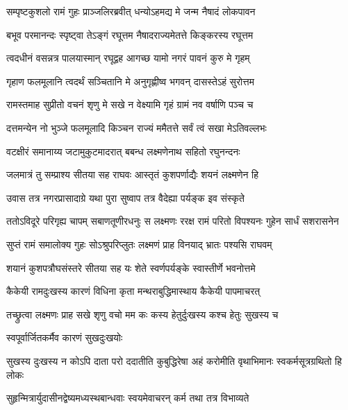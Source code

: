\twolineshloka
{सम्पृष्टकुशलो रामं गुहः प्राञ्जलिरब्रवीत्}
{धन्योऽहमद्य मे जन्म नैषादं लोकपावन} %

\twolineshloka
{बभूव परमानन्दः स्पृष्ट्वा तेऽङ्गं रघूत्तम}
{नैषादराज्यमेतत्ते किङ्करस्य रघूत्तम} %

\twolineshloka
{त्वदधीनं वसन्नत्र पालयास्मान् रघूद्वह}
{आगच्छ यामो नगरं पावनं कुरु मे गृहम्} %

\twolineshloka
{गृहाण फलमूलानि त्वदर्थं सञ्चितानि मे}
{अनुगृह्णीष्व भगवन् दासस्तेऽहं सुरोत्तम} %

\twolineshloka
{रामस्तमाह सुप्रीतो वचनं शृणु मे सखे}
{न वेक्ष्यामि गृहं ग्रामं नव वर्षाणि पञ्च च} %

\twolineshloka
{दत्तमन्येन नो भुञ्जे फलमूलादि किञ्चन}
{राज्यं ममैतत्ते सर्वं त्वं सखा मेऽतिवल्लभः} %

\twolineshloka
{वटक्षीरं समानाय्य जटामुकुटमादरात्}
{बबन्ध लक्ष्मणेनाथ सहितो रघुनन्दनः} %

\twolineshloka
{जलमात्रं तु सम्प्राश्य सीतया सह राघवः}
{आस्तृतं कुशपर्णाद्यैः शयनं लक्ष्मणेन हि} %

\twolineshloka
{उवास तत्र नगरप्रासादाग्रे यथा पुरा}
{सुष्वाप तत्र वैदेह्या पर्यङ्क इव संस्कृते} %

\fourlineindentedshloka
{ततोऽविदूरे परिगृह्य चापम्}
{सबाणतूणीरधनुः स लक्ष्मणः}
{ररक्ष रामं परितो विपश्यनः}
{गुहेन सार्धं सशरासनेन} %





\twolineshloka
{सुप्तं रामं समालोक्य गुहः सोऽश्रुपरिप्लुतः}
{लक्ष्मणं प्राह विनयाद् भ्रातः पश्यसि राघवम्} %

\twolineshloka
{शयानं कुशपत्रौघसंस्तरे सीतया सह}
{यः शेते स्वर्णपर्यङ्के स्वास्तीर्णे भवनोत्तमे} %

\twolineshloka
{कैकेयी रामदुःखस्य कारणं विधिना कृता}
{मन्थराबुद्धिमास्थाय कैकेयी पापमाचरत्} %

\twolineshloka
{तच्छ्रुत्वा लक्ष्मणः प्राह सखे शृणु वचो मम}
{कः कस्य हेतुर्दुःखस्य कश्च हेतुः सुखस्य च} %

\onelineshloka
{स्वपूर्वार्जितकर्मैव कारणं सुखदुःखयोः} %

\fourlineindentedshloka
{सुखस्य दुःखस्य न कोऽपि दाता}
{परो ददातीति कुबुद्धिरेषा}
{अहं करोमीति वृथाभिमानः}
{स्वकर्मसूत्रग्रथितो हि लोकः} %

\twolineshloka
{सुहृन्मित्रार्युदासीनद्वेष्यमध्यस्थबान्धवाः}
{स्वयमेवाचरन् कर्म तथा तत्र विभाव्यते} %

